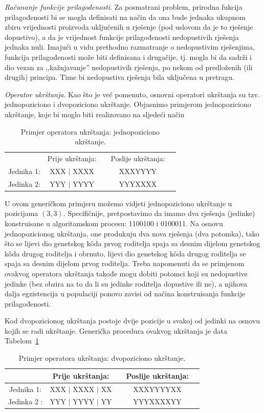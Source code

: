 \documentclass[a4paper, utf8, 11pt, colorlinks]{book}
\theoremstyle{definition}
\begin{document}
\emph{Računanje funkcije prilagođenosti}. Za posmatrani problem, prirodna fukcija prilagođenosti bi se mogla definisati na način da ona bude jednaka ukupnom zbiru vrijednosti proizvoda uključenih u rješenje (pod uslovom da je to rješenje dopustivo), a da je vrijednost funkcije prilagođenosti  nedopustivih rješenja   jednaka nuli. 
Imajući u vidu prethodno razmatranje o nedopustivim rješenjima, funkcija prilagođenosti može biti definisana i drugačije, tj. mogla bi da sadrži i dio vezan za  ,,kažnjavanje'' nedopustivih rješenja, po nekom od predloženih (ili drugih) principa. Time bi nedopustiva rješenja bila uključena u pretragu.

\emph{Operator ukrštanja}. Kao što je već pomenuto, osnovni operatori ukrštanja su tzv. jednopoziciono i dvopoziciono ukrštanje. Objasnimo primjerom jednopoziciono ukrštanje, koje bi moglo biti realizovano na sljedeći način
\begin{table}[H]
	\centering

\begin{tabular}{ccccc}
              &	Prije ukrštanja: &    &  Poslije ukrštanja:   \\
   Jednika 1: &	XXX $\mid$ XXXX  &    &   XXXYYYY             \\
   Jedinka 2:&	YYY $\mid$ YYYY  &    &   YYYXXXX             \\
\end{tabular}
	\caption{Primjer operatora ukrštanja: jednopoziciono ukrštanje.}
\end{table}
U ovom generičkom primjeru možemo vidjeti jednopoziciono ukrštanje u pozicijama $(3, 3).$  Specifičnije, pretpostavimo da imamo dva rješenja (jedinke) konstruisane u algoritamskom procesu: 1100100 i 0100011. Na osnovu jednopozicionog ukrštanja, one produkuju dva nova rješenja (dva potomka), tako što se lijevi dio genetskog k\^oda prvog roditelja spaja sa desnim dijelom genetskog k\^oda drugog roditelja i obrnuto, lijevi dio genetskog k\^oda drugog roditelja se spaja sa desnim dijelom prvog roditelja. 
Treba napomenuti da se primjenom ovakvog operatora ukrštanja takođe mogu dobiti potomci koji su nedopustive jedinke (bez obzira na to da li su jedinke roditelja dopustive ili ne), a njihova dalja egzistencija u populaciji ponovo zavisi od načina konstruisanja funkcije prilagođenosti. 

Kod dvopozicionog ukrštanja postoje dvije pozicije u svakoj od jedinki na osnovu kojih se radi ukrštanje. Generička procedura ovakvog ukrštanja je data Tabelom~\ref{tbl:dvopozukr}
\begin{table}[H]
	\centering
	
	\begin{tabular}{ccccc}
		&	Prije ukrštanja: &    &  Poslije ukrštanja:                         \\\hline
		Jednika 1: &	XXX $\mid$ XXXX $\mid$ XX  &    &   XXXYYYYXX             \\
		Jedinka 2 :&	YYY $\mid$ YYYY $\mid$ YY  &    &   YYYXXXXYY             \\
	\end{tabular}
	\caption{Primjer operatora ukrštanja: dvopoziciono ukrštanje.}\label{tbl:dvopozukr}
\end{table}
\end{document}
